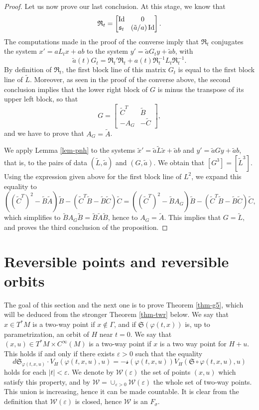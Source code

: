 \documentclass[10pt]{amsart}
\DeclareMathOperator{\Id}{Id}
\let\epsilon\varepsilon
\newcommand{\gs}{\ensuremath{\mathfrak{s}}}
\newcommand{\gR}{\ensuremath{\mathfrak{R}}}
\newcommand{\gS}{\ensuremath{\mathfrak{S}}}
\newcommand{\ms}{\ensuremath{\mathscr{s}}}
\newcommand{\mW}{\ensuremath{\mathcal{W}}}
\theoremstyle{plain}
\theoremstyle{definition}
\begin{document}
\begin{proof}
Let us now prove our last conclusion. At this stage, we know that\vspace*{-3pt}
\[\arraycolsep4.5pt
\gR_t = \begin{bmatrix}
\Id&0\\ \gs_t & (\tilde a /a) \Id
\end{bmatrix}.
\]
The computations made in the proof of the converse imply that
$\gR_t$ conjugates the system $x'=aL_tx+ab$ to the system $y'=\tilde a G_t y +\tilde a b$,
with\vspace*{-3pt}
\[
\tilde a (t) G_t=\gR_t'\gR_t +a(t)\gR_t^{-1} L_t\gR_t^{-1}.
\]
By definition of $\gR_t$, the first block line of this matrix $G_t$ is equal to the first block line of $\tilde L$.
Moreover, as seen in the proof of the converse above, the second conclusion implies that the lower right block of $G$
is minus the transpose of its upper left block, so that\vspace*{-3pt}
\[
G=\begin{bmatrix}
\tilde C^T & \tilde B\\ -A_G & -\tilde C
\end{bmatrix},
\]
and we have to prove that $A_G=\tilde A$.

We apply Lemma \ref{lem-pnh} to the systems $\tilde x'=\tilde a \tilde L \tilde x+ \tilde a b$ and
$y'=\tilde a G y +\tilde a b$, that is, to the pairs of data $(\tilde L, \tilde a)$ and $(G,\tilde a)$.
We obtain that $[G^3]=[\tilde L^3]$.
Using the expression given above for the first block line of $L^2$, we
expand this equality to
\[
((\tilde C^T)^2-\tilde B \tilde A)\tilde B-(\tilde C^T\tilde B-\tilde B\tilde C)\tilde C=
((\tilde C^T)^2-\tilde B A_G)\tilde B-(\tilde C^T\tilde B-\tilde B\tilde C)\tilde C,
\]
which simplifies to $\tilde BA_G\tilde B= \tilde B \tilde A \tilde B$, hence to $A_G=\tilde A$.
This implies that $G=\tilde L$, and proves the third conclusion of the proposition.
\end{proof}

\section{Reversible points and reversible orbits}\label{sec-rev}

The goal of this section and the next one is to prove Theorem \ref{thm-g5},
which will be deduced from the stronger Theorem \ref{thm-twr} below.
We say that $x\in T^*M$ is a two-way point if $x\not \in \Gamma$, and if $\gS(\varphi(t,x))$ is, up to parametrization,
an orbit of $H$ near $t=0$. We say that $(x,u)\in T^*M \times C^{\infty}(M)$ is a two-way point if $x$ is a two way point for $H+u$.
This holds if and only if there exists $\epsilon>0$ such that the equality
\[
d\gS_{\varphi(t,x,u)}\cdot V_H(\varphi(t,x,u),u)=-\ms(\varphi(t,x,u))V_H(\gS\circ \varphi(t,x,u),u)
\]
holds for each $|t|<\epsilon$. We denote by $\mW(\epsilon)$ the set of points $(x,u)$ which satisfy this property, and by
$\mW=\cup_{\epsilon>0} \mW(\epsilon)$ the whole set of two-way points. This union is increasing, hence it can be made countable.
It is clear from the definition that $\mW(\epsilon)$ is closed, hence $\mW$ is an $F_{\sigma}$.
\end{document}
